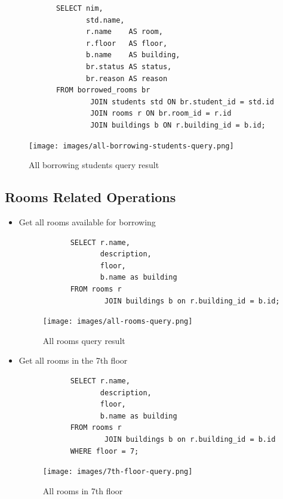 \documentclass[12pt,titlepage]{article}
\begin{document}
\begin{itemize}
{        \begin{verbatim}
            SELECT nim,
                   std.name,
                   r.name    AS room,
                   r.floor   AS floor,
                   b.name    AS building,
                   br.status AS status,
                   br.reason AS reason
            FROM borrowed_rooms br
                    JOIN students std ON br.student_id = std.id
                    JOIN rooms r ON br.room_id = r.id
                    JOIN buildings b ON r.building_id = b.id;
        \end{verbatim}

        \begin{figure}[h]
            \centering
            \texttt{[image: images/all-borrowing-students-query.png]}
            \caption{All borrowing students query result}
        \end{figure}
    }
\end{itemize}

\pagebreak

\subsection{Rooms Related Operations}
\begin{itemize}
    \item {
        Get all rooms available for borrowing

        \begin{verbatim}
            SELECT r.name,
                   description,
                   floor,
                   b.name as building
            FROM rooms r
                    JOIN buildings b on r.building_id = b.id;
        \end{verbatim}

        \begin{figure}[h]
            \centering
            \texttt{[image: images/all-rooms-query.png]}
            \caption{All rooms query result}
        \end{figure}
    }
    \item {
        Get all rooms in the 7th floor

        \begin{verbatim}
            SELECT r.name,
                   description,
                   floor,
                   b.name as building
            FROM rooms r
                    JOIN buildings b on r.building_id = b.id
            WHERE floor = 7;
        \end{verbatim}

        \begin{figure}[h]
            \centering
            \texttt{[image: images/7th-floor-query.png]}
            \caption{All rooms in 7th floor}
        \end{figure}
    }
\end{itemize}
\end{document}
